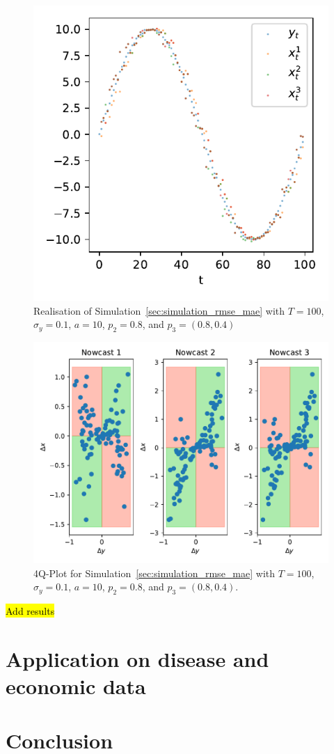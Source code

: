 \documentclass[oneside]{article}
\theoremstyle{plain}%
\theoremstyle{definition}
\begin{document}
\begin{figure}
  \centering
  \includegraphics{plots/simulation_same_rmse_mae/time_series.pdf}
  \caption{Realisation of Simulation~\ref{sec:simulation_rmse_mae} with $T = 100$, $\sigma_y=0.1$, $a = 10$, $p_2 = 0.8$, and $p_3 = (0.8, 0.4)$}
  \label{fig:simulation_rmse_mae_ts}
\end{figure}

\begin{figure}
  \centering
  \includegraphics{plots/simulation_same_rmse_mae/4q_plot.pdf}
  \caption{4Q-Plot for Simulation~\ref{sec:simulation_rmse_mae} with $T = 100$, $\sigma_y=0.1$, $a = 10$, $p_2 = 0.8$, and $p_3 = (0.8, 0.4)$.}
  \label{fig:simulation_rmse_mae_4q}
\end{figure}

\hl{Add results}

\section{Application on disease and economic data}

\section{Conclusion}
\end{document}
